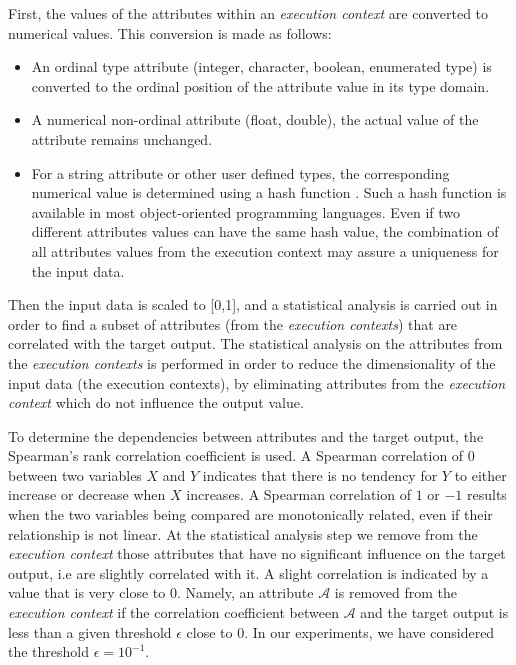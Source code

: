 First, the values of the attributes within an \emph{execution context} are converted to numerical values. This conversion is made as follows:

\begin{itemize}

\item An ordinal type attribute (integer, character, boolean, enumerated type) is converted to the ordinal position of the attribute value in its type domain.   

\item A numerical non-ordinal attribute (float, double), the actual value of the attribute remains unchanged.

\item For a string attribute or other user defined types, the corresponding numerical value is determined using a hash function \cite{Cormen09Introduction}. Such a hash function is available in most object-oriented programming languages. Even if two different attributes values can have the same hash value, the combination of all attributes values from the execution context may assure a uniqueness for the input data.    

\end{itemize} 
 
Then the input data is scaled to [0,1], and a statistical analysis is carried out in order to find a subset of attributes (from the \emph{execution contexts}) that are correlated with the target output.  The statistical analysis on the attributes from the \emph{execution contexts} is performed in order to reduce the dimensionality of the input data (the execution contexts), by eliminating attributes from the \emph{execution context} which do not influence the output value. 

To determine the dependencies between attributes and the target output, the Spearman's rank correlation coefficient \cite{spearman} is used. A Spearman correlation of $0$ between two variables $X$ and $Y$ indicates that there is no tendency for $Y$ to either increase or decrease when $X$ increases. A Spearman correlation of $1$ or $-1$ results when the two variables being compared are monotonically related, even if their relationship is not linear.  At the statistical analysis step we remove from the \emph{execution context} those attributes that have no significant influence on the target output, i.e are slightly correlated with it. A slight correlation is indicated by a value that is very close to $0$. Namely, an attribute $\mathcal{A}$ is removed from the \emph{execution context} if the correlation coefficient between $\mathcal{A}$ and the target output is less than a given threshold $\epsilon$ close to $0$. In our experiments, we have considered the threshold $\epsilon=10^{-1}$.

